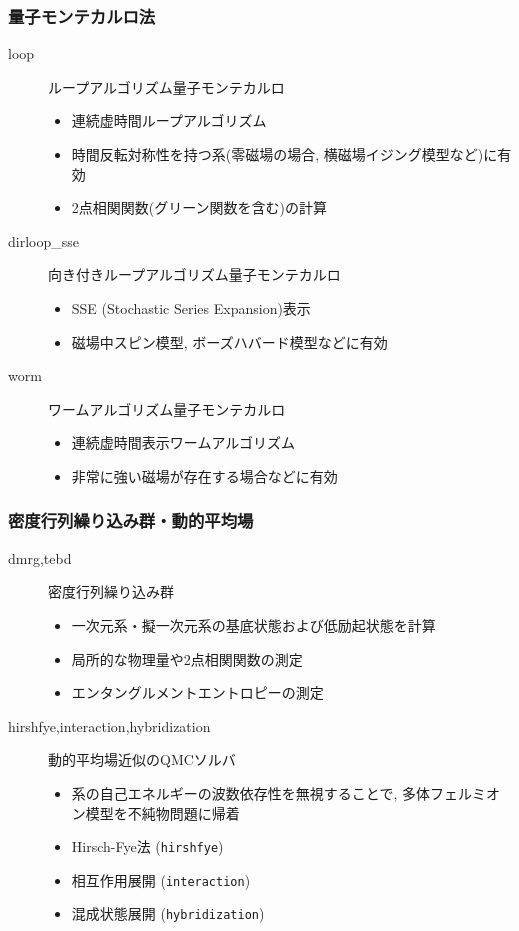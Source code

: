 \begin{frame}
  \frametitle{量子モンテカルロ法}
  \begin{description}
  \item[loop] ループアルゴリズム量子モンテカルロ
    \begin{itemize}
      \item 連続虚時間ループアルゴリズム
      \item 時間反転対称性を持つ系(零磁場の場合, 横磁場イジング模型など)に有効
      \item 2点相関関数(グリーン関数を含む)の計算
    \end{itemize}
  \item[dirloop\_sse] 向き付きループアルゴリズム量子モンテカルロ
    \begin{itemize}
      \item SSE (Stochastic Series Expansion)表示
      \item 磁場中スピン模型, ボーズハバード模型などに有効
    \end{itemize}
  \item[worm] ワームアルゴリズム量子モンテカルロ
    \begin{itemize}
      \item 連続虚時間表示ワームアルゴリズム
      \item 非常に強い磁場が存在する場合などに有効
    \end{itemize}
  \end{description}
\end{frame}

\begin{frame}
  \frametitle{密度行列繰り込み群・動的平均場}
  \begin{description}
  \item[dmrg,tebd] 密度行列繰り込み群
    \begin{itemize}
      \item 一次元系・擬一次元系の基底状態および低励起状態を計算
      \item 局所的な物理量や2点相関関数の測定
      \item エンタングルメントエントロピーの測定
    \end{itemize}
  \item[hirshfye,interaction,hybridization] 動的平均場近似のQMCソルバ
    \begin{itemize}
      \item 系の自己エネルギーの波数依存性を無視することで, 多体フェルミオン模型を不純物問題に帰着
      \item Hirsch-Fye法 ({\tt hirshfye})
      \item 相互作用展開 ({\tt interaction})
      \item 混成状態展開 ({\tt hybridization})
    \end{itemize}
  \end{description}
\end{frame}



